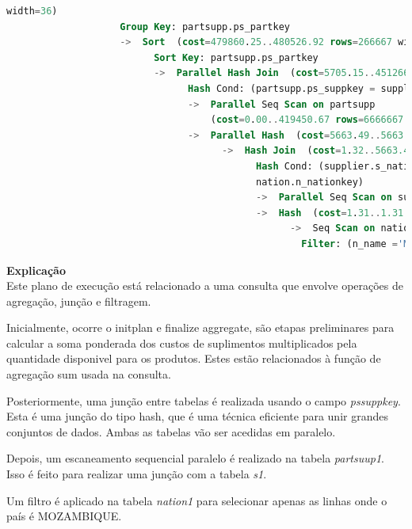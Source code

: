 \documentclass{article}
\begin{document}
\begin{lstlisting}[language=SQL]
                    width=36)
                    Group Key: partsupp.ps_partkey
                    ->  Sort  (cost=479860.25..480526.92 rows=266667 width=14)
                          Sort Key: partsupp.ps_partkey
                          ->  Parallel Hash Join  (cost=5705.15..451266.82 rows=266667 width=14)
                                Hash Cond: (partsupp.ps_suppkey = supplier.s_suppkey)
                                ->  Parallel Seq Scan on partsupp  
                                    (cost=0.00..419450.67 rows=6666667 width=18)
                                ->  Parallel Hash  (cost=5663.49..5663.49 rows=3333 width=4)
                                      ->  Hash Join  (cost=1.32..5663.49 rows=3333 width=4)
                                            Hash Cond: (supplier.s_nationkey = 
                                            nation.n_nationkey)
                                            ->  Parallel Seq Scan on supplier  (cost=0.00..5316.33 rows=83333 width=8)
                                            ->  Hash  (cost=1.31..1.31 rows=1 width=4)
                                                  ->  Seq Scan on nation  (cost=0.00..1.31 rows=1 width=4)
                                                    Filter: (n_name ='MOZAMBIQUE'::bpchar)

\end{lstlisting}

\textbf{Explicação}\\
Este plano de execução está relacionado a uma consulta que envolve operações de agregação, junção e filtragem.

Inicialmente, ocorre o initplan e finalize aggregate, são etapas preliminares para calcular a soma ponderada dos custos de suplimentos multiplicados pela quantidade disponivel para os produtos. Estes estão relacionados à função de agregação sum usada na consulta.

Posteriormente, uma junção entre tabelas é realizada usando o campo \textit{ps\underline{}suppkey}. Esta é uma junção do tipo hash, que é uma técnica eficiente para unir grandes conjuntos de dados. Ambas as tabelas vão ser acedidas em paralelo. 

Depois, um escaneamento sequencial paralelo é realizado na tabela \textit{partsuup\underline{}1}. Isso é feito para realizar uma junção com a tabela \textit{s\underline{}1}.

Um filtro é aplicado na tabela \textit{nation\underline{}1} para selecionar apenas as linhas onde o país é MOZAMBIQUE.
\end{document}
